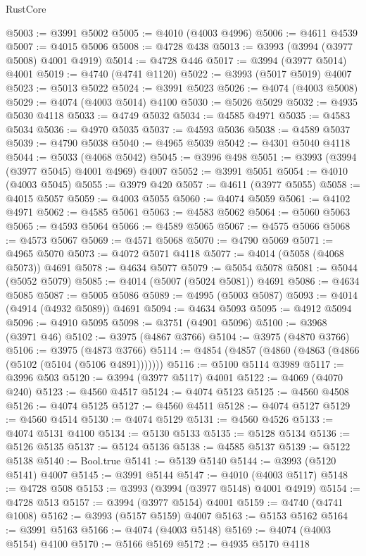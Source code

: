 \begin{lexlean}{RustCore}
\begin{coremodule}
@5003 := @3991 @5002
@5005 := @4010 (@4003 @4996)
@5006 := @4611 @4539
@5007 := @4015 @5006
@5008 := @4728 @438
@5013 := @3993 (@3994 (@3977 @5008) @4001 @4919)
@5014 := @4728 @446
@5017 := @3994 (@3977 @5014) @4001
@5019 := @4740 (@4741 @1120)
@5022 := @3993 (@5017 @5019) @4007
@5023 := @5013 @5022
@5024 := @3991 @5023
@5026 := @4074 (@4003 @5008)
@5029 := @4074 (@4003 @5014) @4100
@5030 := @5026 @5029
@5032 := @4935 @5030 @4118
@5033 := @4749 @5032
@5034 := @4585 @4971
@5035 := @4583 @5034
@5036 := @4970 @5035
@5037 := @4593 @5036
@5038 := @4589 @5037
@5039 := @4790 @5038
@5040 := @4965 @5039
@5042 := @4301 @5040 @4118
@5044 := @5033 (@4068 @5042)
@5045 := @3996 @498
@5051 := @3993 (@3994 (@3977 @5045) @4001 @4969) @4007
@5052 := @3991 @5051
@5054 := @4010 (@4003 @5045)
@5055 := @3979 @420
@5057 := @4611 (@3977 @5055)
@5058 := @4015 @5057
@5059 := @4003 @5055
@5060 := @4074 @5059
@5061 := @4102 @4971
@5062 := @4585 @5061
@5063 := @4583 @5062
@5064 := @5060 @5063
@5065 := @4593 @5064
@5066 := @4589 @5065
@5067 := @4575 @5066
@5068 := @4573 @5067
@5069 := @4571 @5068
@5070 := @4790 @5069
@5071 := @4965 @5070
@5073 := @4072 @5071 @4118
@5077 := @4014 (@5058 (@4068 @5073)) @4691
@5078 := @4634 @5077
@5079 := @5054 @5078
@5081 := @5044 (@5052 @5079)
@5085 := @4014 (@5007 (@5024 @5081)) @4691
@5086 := @4634 @5085
@5087 := @5005 @5086
@5089 := @4995 (@5003 @5087)
@5093 := @4014 (@4914 (@4932 @5089)) @4691
@5094 := @4634 @5093
@5095 := @4912 @5094
@5096 := @4910 @5095
@5098 := @3751 (@4901 @5096)
@5100 := @3968 (@3971 @46)
@5102 := @3975 (@4867 @3766)
@5104 := @3975 (@4870 @3766)
@5106 := @3975 (@4873 @3766)
@5114 := @4854 (@4857 (@4860 (@4863 (@4866 (@5102 (@5104 (@5106 @4891)))))))
@5116 := @5100 @5114 @3989
@5117 := @3996 @503
@5120 := @3994 (@3977 @5117) @4001
@5122 := @4069 (@4070 @240)
@5123 := @4560 @4517
@5124 := @4074 @5123
@5125 := @4560 @4508
@5126 := @4074 @5125
@5127 := @4560 @4511
@5128 := @4074 @5127
@5129 := @4560 @4514
@5130 := @4074 @5129
@5131 := @4560 @4526
@5133 := @4074 @5131 @4100
@5134 := @5130 @5133
@5135 := @5128 @5134
@5136 := @5126 @5135
@5137 := @5124 @5136
@5138 := @4585 @5137
@5139 := @5122 @5138
@5140 := Bool.true
@5141 := @5139 @5140
@5144 := @3993 (@5120 @5141) @4007
@5145 := @3991 @5144
@5147 := @4010 (@4003 @5117)
@5148 := @4728 @508
@5153 := @3993 (@3994 (@3977 @5148) @4001 @4919)
@5154 := @4728 @513
@5157 := @3994 (@3977 @5154) @4001
@5159 := @4740 (@4741 @1008)
@5162 := @3993 (@5157 @5159) @4007
@5163 := @5153 @5162
@5164 := @3991 @5163
@5166 := @4074 (@4003 @5148)
@5169 := @4074 (@4003 @5154) @4100
@5170 := @5166 @5169
@5172 := @4935 @5170 @4118

\end{coremodule}
\end{lexlean}
